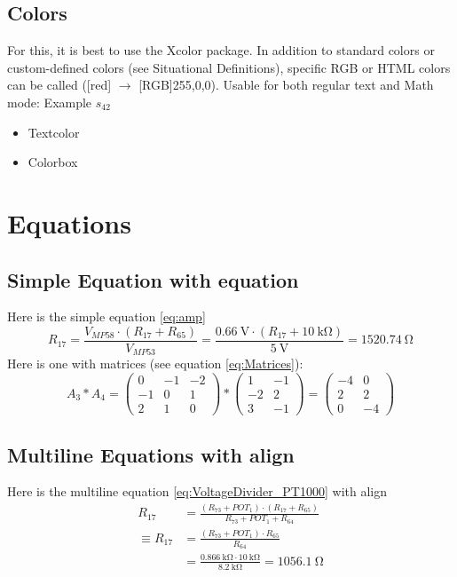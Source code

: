 \documentclass{scrartcl}
\begin{document}
\subsection{Colors}
For this, it is best to use the Xcolor package. In addition to standard colors or custom-defined colors (see Situational Definitions), specific RGB or HTML colors can be called ([red] $\to$ [RGB]{255,0,0}). Usable for both regular text and Math mode: \textcolor[RGB]{255,0,0}{Example $s_{42}$}
\begin{itemize}
    \item \textcolor[RGB]{100,100,100}{Textcolor}
    \item \colorbox{codegreen}{Colorbox}
\end{itemize}

\section{Equations}
\subsection{Simple Equation with equation}
Here is the simple equation \ref{eq:amp}
\begin{equation}
\label{eq:amp}
 R_{17}=\frac{V_{MP58}\cdot (R_{17}+R_{65})}{V_{MP53}} = \frac{\SI{0.66}{\volt}\cdot (R_{17}+\SI{10}{\kilo\ohm})}{\SI{5}{\volt}}=\SI{1520.74}{\ohm}
\end{equation}
Here is one with matrices (see equation \ref{eq:Matrices}):
\begin{equation}
\label{eq:Matrices}
A_3*A_4=
    \left(\begin{array}{ccc}
         0&-1&-2\\
         -1 & 0&1\\
         2 & 1& 0
    \end{array}\right)
    *
    \left(\begin{array}{cc}
         1 & -1\\
         -2 &2\\
         3 & -1
    \end{array}\right)
    =
    \left(\begin{array}{cc}
         -4 & 0\\
         2 & 2\\
         0 & -4
    \end{array}\right)
\end{equation}
\subsection{Multiline Equations with align}
Here is the multiline equation \ref{eq:VoltageDivider_PT1000} with align
\begin{align}
\label{eq:VoltageDivider_PT1000}
    R_{17}&=\frac{(R_{73}+POT_1)\cdot(R_{17}+R_{65})}{R_{73}+POT_1+R_{64}}\\
    \equiv R_{17}&=\frac{(R_{73}+POT_1)\cdot R_{65}}{R_{64}}\\
    &=\frac{\SI{0.866}{\kilo\ohm}\cdot\SI{10}{\kilo\ohm}}{\SI{8.2}{\kilo\ohm}}=\SI{1056.1}{\ohm}
\end{align}
\end{document}

